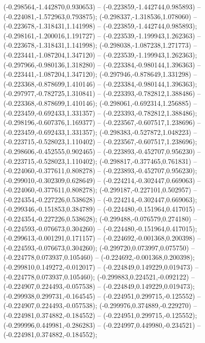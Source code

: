  (-0.298564,-1.442870,0.930653) -- (-0.223859,-1.442744,0.985893) -- (-0.224081,-1.572963,0.793875);
 (-0.298337,-1.318536,1.078060) -- (-0.223678,-1.318431,1.141998) -- (-0.223859,-1.442744,0.985893);
 (-0.298161,-1.200016,1.191727) -- (-0.223539,-1.199943,1.262363) -- (-0.223678,-1.318431,1.141998);
 (-0.298038,-1.087238,1.271773) -- (-0.223441,-1.087204,1.347120) -- (-0.223539,-1.199943,1.262363);
 (-0.297966,-0.980136,1.318280) -- (-0.223384,-0.980144,1.396363) -- (-0.223441,-1.087204,1.347120);
 (-0.297946,-0.878649,1.331298) -- (-0.223368,-0.878699,1.410146) -- (-0.223384,-0.980144,1.396363);
 (-0.297977,-0.782725,1.310841) -- (-0.223393,-0.782812,1.388486) -- (-0.223368,-0.878699,1.410146);
 (-0.298061,-0.692314,1.256885) -- (-0.223459,-0.692433,1.331357) -- (-0.223393,-0.782812,1.388486);
 (-0.298196,-0.607376,1.169377) -- (-0.223567,-0.607517,1.238696) -- (-0.223459,-0.692433,1.331357);
 (-0.298383,-0.527872,1.048223) -- (-0.223715,-0.528023,1.110402) -- (-0.223567,-0.607517,1.238696);
 (-0.298606,-0.452555,0.902465) -- (-0.223893,-0.452707,0.956230) -- (-0.223715,-0.528023,1.110402);
 (-0.298817,-0.377465,0.761831) -- (-0.224060,-0.377611,0.808278) -- (-0.223893,-0.452707,0.956230);
 (-0.299010,-0.302309,0.628649) -- (-0.224214,-0.302447,0.669063) -- (-0.224060,-0.377611,0.808278);
 (-0.299187,-0.227101,0.502957) -- (-0.224354,-0.227226,0.538628) -- (-0.224214,-0.302447,0.669063);
 (-0.299346,-0.151853,0.384789) -- (-0.224480,-0.151964,0.417015) -- (-0.224354,-0.227226,0.538628);
 (-0.299488,-0.076579,0.274180) -- (-0.224593,-0.076673,0.304260) -- (-0.224480,-0.151964,0.417015);
 (-0.299613,-0.001291,0.171157) -- (-0.224692,-0.001368,0.200398) -- (-0.224593,-0.076673,0.304260);
 (-0.299720,0.073997,0.075750) -- (-0.224778,0.073937,0.105460) -- (-0.224692,-0.001368,0.200398);
 (-0.299810,0.149272,-0.012017) -- (-0.224849,0.149229,0.019473) -- (-0.224778,0.073937,0.105460);
 (-0.299883,0.224521,-0.092122) -- (-0.224907,0.224493,-0.057538) -- (-0.224849,0.149229,0.019473);
 (-0.299938,0.299731,-0.164545) -- (-0.224951,0.299715,-0.125552) -- (-0.224907,0.224493,-0.057538);
 (-0.299976,0.374889,-0.229270) -- (-0.224981,0.374882,-0.184552) -- (-0.224951,0.299715,-0.125552);
 (-0.299996,0.449981,-0.286283) -- (-0.224997,0.449980,-0.234521) -- (-0.224981,0.374882,-0.184552);
